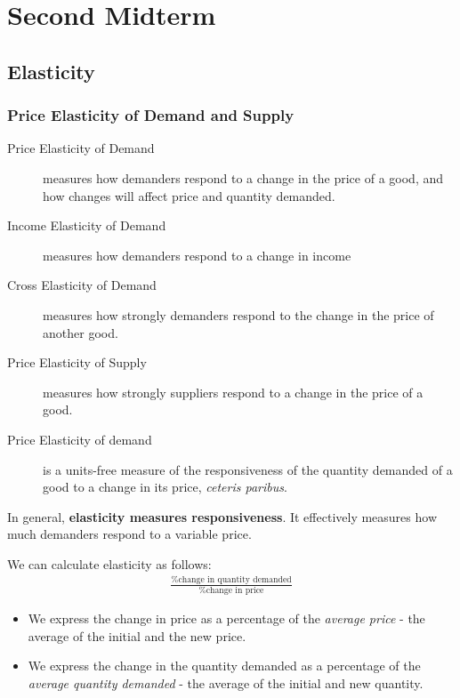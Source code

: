     \part{Second Midterm} %
    \label{prt:second_ _midterm_}
        \chapter{Elasticity} %
        \label{cha:elasticity}
            \section{Price Elasticity of Demand and Supply} %
            \label{sec:price_elasticity_of_demand_and_supply}
                \begin{description}
                    \item[Price Elasticity of Demand] measures how demanders respond to a change in the price of a good, and how changes will affect price and quantity demanded.
                    \item[Income Elasticity of Demand] measures how demanders respond to a change in income
                    \item[Cross Elasticity of Demand] measures how strongly demanders respond to the change in the price of another good.
                    \item[Price Elasticity of Supply] measures how strongly suppliers respond to a change in the price of a good.
                    \item[Price Elasticity of demand] is a units-free measure of the responsiveness of the quantity demanded of a good to a change in its price, \emph{ceteris paribus}.
                \end{description}

                In general, \textbf{elasticity measures responsiveness}.
                It effectively measures how much demanders respond to a variable price.

                We can calculate elasticity as follows:
                \begin{align*}
                    \frac{\text{\% change in quantity demanded}}{\text{\% change in price}}
                \end{align*}

                \begin{itemize}
                    \item We express the change in price as a percentage of the \emph{average price} - the average of the initial and the new price.
                    \item We express the change in the quantity demanded as a percentage of the \emph{average quantity demanded} - the average of the initial and new quantity.
                \end{itemize}

